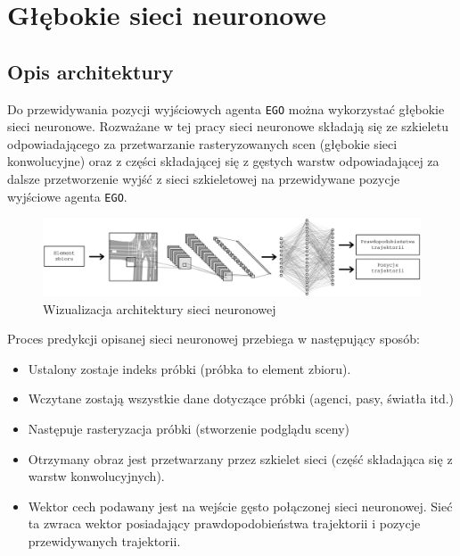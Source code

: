 \chapter{Głębokie sieci neuronowe}
\thispagestyle{chapterBeginStyle}

\section{Opis architektury}

Do przewidywania pozycji wyjściowych agenta \texttt{EGO} można wykorzystać głębokie sieci neuronowe. Rozważane w tej pracy sieci neuronowe składają się ze szkieletu odpowiadającego za przetwarzanie rasteryzowanych scen (głębokie sieci konwolucyjne) oraz z części składającej się z gęstych warstw odpowiadającej za dalsze przetworzenie wyjść z sieci szkieletowej na przewidywane pozycje wyjściowe agenta \texttt{EGO}.

\begin{figure}[htbp]
    \centering
    \includegraphics[width=\linewidth]{nn_schema.png}
    \caption{Wizualizacja architektury sieci neuronowej}
\end{figure}

\noindent
Proces predykcji opisanej sieci neuronowej przebiega w następujący sposób:
\begin{itemize}
    \setlength{\itemsep}{1pt}
    \setlength{\parskip}{0pt}
    \setlength{\parsep}{0pt}
    \item Ustalony zostaje indeks próbki (próbka to element zbioru).
    \item Wczytane zostają wszystkie dane dotyczące próbki (agenci, pasy, światła itd.)
    \item Następuje rasteryzacja próbki (stworzenie podglądu sceny)
    \item Otrzymany obraz jest przetwarzany przez szkielet sieci (część składająca się z warstw konwolucyjnych).
    \item Wektor cech podawany jest na wejście gęsto połączonej sieci neuronowej. Sieć ta zwraca wektor posiadający prawdopodobieństwa trajektorii i pozycje przewidywanych trajektorii.
\end{itemize}

